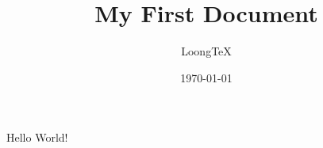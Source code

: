 \documentclass{article}
\title{My First Document}
\author{LoongTeX}
\date{\today}
\begin{document}
	\maketitle
	Hello World!
\end{document}
